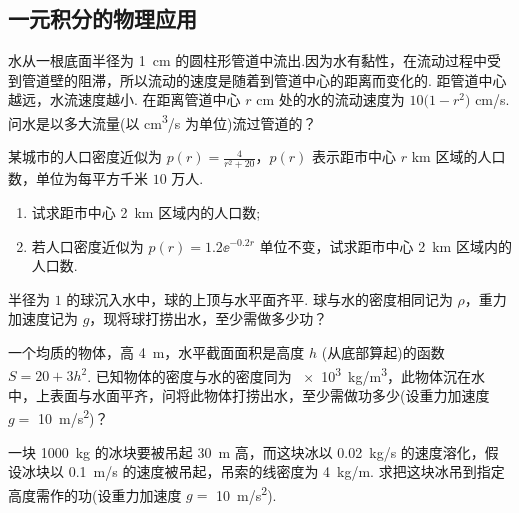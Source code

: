 \subsection{一元积分的物理应用}

	\begin{ti}
		水从一根底面半径为 \SI{1}{cm} 的圆柱形管道中流出.因为水有黏性，在流动过程中受到管道壁的阻滞，所以流动的速度是随着到管道中心的距离而变化的. 距管道中心越远，水流速度越小. 在距离管道中心 $r$ \si{cm} 处的水的流动速度为 $10 \bigl(1 - r^{2}\bigr)$ \si{cm/s}. 问水是以多大流量(以 \si{cm^{3}/s} 为单位)流过管道的？
	\end{ti}

	\begin{ti}
		某城市的人口密度近似为 $p(r) = \frac{4}{r^{2} + 20}$，$p(r)$ 表示距市中心 $r$ \si{km} 区域的人口数，单位为每平方千米 $10$ 万人.
		\begin{enumerate}
			\item 试求距市中心 \SI{2}{km} 区域内的人口数;
			\item 若人口密度近似为 $p(r) = 1.2 \ee^{-0.2r}$ 单位不变，试求距市中心 \SI{2}{km} 区域内的人口数.
		\end{enumerate}
	\end{ti}

	\begin{ti}
		半径为 $1$ 的球沉入水中，球的上顶与水平面齐平. 球与水的密度相同记为 $\rho$，重力加速度记为 $g$，现将球打捞出水，至少需做多少功？
	\end{ti}

	\begin{ti}
		一个均质的物体，高 \SI{4}{m}，水平截面面积是高度 $h$ (从底部算起)的函数 $S = 20 + 3h^{2}$. 已知物体的密度与水的密度同为 \SI{e3}{kg/m^3}，此物体沉在水中，上表面与水面平齐，问将此物体打捞出水，至少需做功多少(设重力加速度 $g = $ \SI{10}{m/s^2})？
	\end{ti}

	\begin{ti}
		一块 \SI{1000}{kg} 的冰块要被吊起 \SI{30}{m} 高，而这块冰以 \SI{0.02}{kg/s} 的速度溶化，假设冰块以 \SI{0.1}{m/s} 的速度被吊起，吊索的线密度为 \SI{4}{kg/m}. 求把这块冰吊到指定高度需作的功(设重力加速度 $g = $ \SI{10}{m/s^2}).
	\end{ti}

